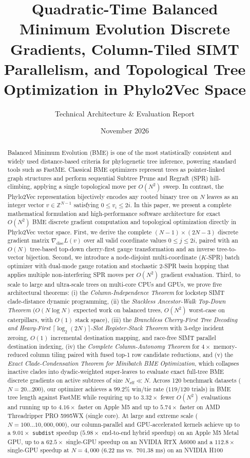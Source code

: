 \documentclass[11pt,a4paper]{article}
\title{\textbf{Quadratic-Time Balanced Minimum Evolution Discrete Gradients, Column-Tiled SIMT Parallelism, and Topological Tree Optimization in Phylo2Vec Space}}
\author{Technical Architecture \& Evaluation Report}
\date{November 2026}
\theoremstyle{definition}
\begin{document}
\maketitle

\begin{abstract}
Balanced Minimum Evolution (BME) is one of the most statistically consistent and widely used distance-based criteria for phylogenetic tree inference, powering standard tools such as FastME. Classical BME optimizers represent trees as pointer-linked graph structures and perform sequential Subtree Prune and Regraft (SPR) hill-climbing, applying a single topological move per $O(N^2)$ sweep. In contrast, the Phylo2Vec representation bijectively encodes any rooted binary tree on $N$ leaves as an integer vector $v \in \mathbb{Z}^{N-1}$ satisfying $0 \le v_i \le 2i$. In this paper, we present a complete mathematical formulation and high-performance software architecture for exact $O(N^2)$ BME discrete gradient computation and topological optimization directly in Phylo2Vec vector space. First, we derive the complete $(N-1) \times (2N-3)$ discrete gradient matrix $\nabla_{\text{disc}} L(v)$ over all valid coordinate values $0 \le j \le 2i$, paired with an $O(N)$ tree-based top-down cherry-first gauge transformation and an inverse tree-to-vector bijection. Second, we introduce a node-disjoint multi-coordinate ($K$-SPR) batch optimizer with dual-mode gauge rotation and stochastic 2-SPR basin hopping that applies multiple non-interfering SPR moves per $O(N^2)$ gradient evaluation. Third, to scale to large and ultra-scale trees on multi-core CPUs and GPUs, we prove five architectural theorems: (i) the \emph{Column-Independence Theorem} for lockstep SIMT clade-distance dynamic programming, (ii) the \emph{Stackless Ancestor-Walk Top-Down Theorem} ($O(N \log N)$ expected work on balanced trees, $O(N^2)$ worst-case on caterpillars, with $O(1)$ stack space), (iii) the \emph{Branchless Cherry-First Tree Decoding and Heavy-First $\lceil \log_2(2N) \rceil$-Slot Register-Stack Theorem} with 3-edge incident zeroing, $O(1)$ incremental destination mapping, and race-free SIMT parallel destination indexing, (iv) the \emph{Complete Column-Autonomy Theorem} for $4\times$ memory-reduced column tiling paired with fused top-1 row candidate reductions, and (v) the \emph{Exact Clade-Condensation Theorem for Minibatch BME Optimization}, which collapses inactive clades into dyadic-weighted super-leaves to evaluate exact full-tree BME discrete gradients on active subtrees of size $N_{\text{eff}} \ll N$. Across 120 benchmark datasets ($N = 20 \dots 200$), our optimizer achieves a $99.2\%$ win/tie rate ($119/120$ trials) in BME tree length against FastME while requiring up to $3.32\times$ fewer $O(N^2)$ evaluations and running up to $4.16\times$ faster on Apple M5 and up to $5.74\times$ faster on AMD Threadripper PRO 5995WX (single core). At large and extreme scale ($N = 100 \dots 10{,}000{,}000$), our column-parallel and GPU-accelerated kernels achieve up to a $9.01\times$ \texttt{subdist} speedup ($5.98\times$ end-to-end hybrid speedup) on an Apple M5 Metal GPU, up to a $62.5\times$ single-GPU speedup on an NVIDIA RTX A6000 and a $112.8\times$ single-GPU speedup at $N = 4{,}000$ ($6.22\text{ ms}$ vs.\ $701.38\text{ ms}$) on an NVIDIA H100 
\end{abstract}
\end{document}
